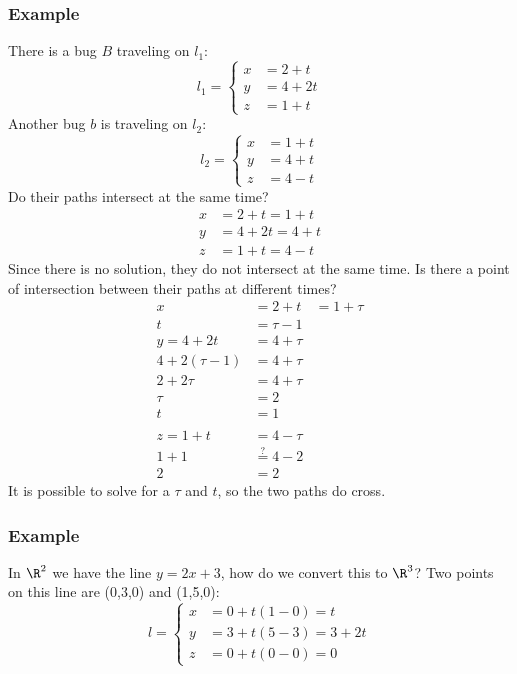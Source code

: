 \documentclass[letterpaper, 12pt]{math}
\begin{document}
\subsubsection*{Example}
There is a bug \( B \) traveling on \( l_1 \):
\[ l_1 = \begin{cases}
  x &= 2+t \\
  y &= 4+2t \\
  z &= 1+t
\end{cases} \]
Another bug \( b \) is traveling on \( l_2 \):
\[ l_2 = \begin{cases}
  x &= 1+t \\
  y &= 4+t \\
  z &= 4-t
\end{cases} \]
Do their paths intersect at the same time?
\begin{align*}
  x &= 2+t = 1+t \\
  y &= 4+2t = 4+t \\
  z &= 1+t = 4-t
\end{align*}
Since there is no solution, they do not intersect at the same time. Is there
a point of intersection between their paths at different times?
\begin{align*}
  x &= 2+t &= 1+\tau \\
  t &= \tau-1 \\
  y = 4+2t &= 4+\tau \\
  4+2(\tau-1) &= 4+\tau \\
  2+2\tau &= 4+\tau \\
  \tau &= 2 \\
  t &= 1 \\ \\
  z = 1+t &= 4-\tau \\
  1+1 &\stackrel{?}{=} 4-2 \\
  2 &= 2
\end{align*}
It is possible to solve for a \( \tau \) and \( t \), so the two paths do cross.

\subsubsection*{Example}
In \( \R^2 \) we have the line \( y=2x+3 \), how do we convert this to
\( \R^3 \)? Two points on this line are (0,3,0) and (1,5,0):
\[ l = \begin{cases}
  x &= 0+t(1-0) = t \\
  y &= 3+t(5-3) = 3+2t \\
  z &= 0+t(0-0) = 0
\end{cases} \]
\end{document}
